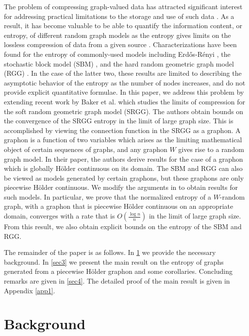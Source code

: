 \documentclass{svproc}
\newcommand{\1}{\mathbbm{1}}
\begin{document}
The problem of compressing graph-valued data has attracted significant interest for  addressing practical limitations to the storage and use of such data \cite{gao2025,xu2025}. As a result, it has become valuable to be able to quantify the information content, or entropy, of different random graph models as the entropy gives limits on the lossless compression of data from a given source \cite{coverthomas}. Characterizations have been found for the entropy of commonly-used models including Erd\H{o}s-R\'{e}nyi \cite{wafula2023}, the stochastic block model (SBM) \cite{abbe2016}, and the hard random geometric graph model (RGG) \cite{vippathalla2026}. In the case of the latter two, these results are limited to describing the asymptotic behavior of the entropy as the number of nodes increases, and do not provide explicit quantitative formulae. In this paper, we address this problem by extending recent work by Baker et al. \cite{bakerpaper} which studies the limits of compression for the soft random geometric graph model (SRGG). The authors obtain bounds on the convergence of the SRGG entropy in the limit of large graph size. This is accomplished by viewing the connection function in the SRGG as a graphon. A graphon is a function of two variables which arises as the limiting mathematical object of certain sequences of graphs, and any graphon $W$ gives rise to a random graph model. In their paper, the authors derive results for the case of a graphon which is globally H\"{o}lder continuous on its domain. The SBM and RGG can also be viewed as models generated by certain graphons, but these graphons are only piecewise H\"{o}lder continuous. We modify the arguments in \cite{bakerpaper} to obtain results for such models. In particular, we prove that the normalized entropy of a $W$-random graph, with a graphon that is piecewise H\"{o}lder continuous on an appropriate domain, converges with a rate that is $O(\frac{\log n}{n})$ in the limit of large graph size. From this result, we also obtain explicit bounds on the entropy of the SBM and RGG. 

The remainder of the paper is as follows. In \cref{sec2} we provide the necessary background. In \cref{sec3} we present the main result on the entropy of graphs generated from a piecewise H\"{o}lder graphon and some corollaries. Concluding remarks are given in \cref{sec4}. The detailed proof of the main result is given in Appendix \ref{app1}.

\section{Background}\label{sec2}
\end{document}
